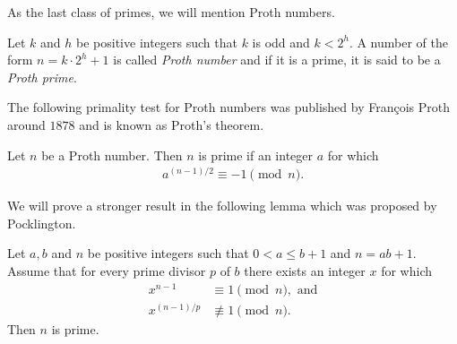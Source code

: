 \documentclass{subfiles}
\begin{document}
	As the last class of primes, we will mention Proth numbers.
	
		\begin{definition}
			Let $k$ and $h$ be positive integers such that $k$ is odd and $k < 2^h$. A number of the form $n=k \cdot 2^h +1$ is called \textit{Proth number} and if it is a prime, it is said to be a \textit{Proth prime}.
		\end{definition}
		
	The following primality test for Proth numbers was published by Fran\c cois Proth around $1878$ and is known as Proth's theorem.
	
		\begin{theorem}
			Let $n$ be a Proth number. Then $n$ is prime if an integer $a$ for which
				\begin{align*}
					a^{(n-1)/2} \equiv -1 \pmod n.
				\end{align*}
		\end{theorem}
		
	We will prove a stronger result in the following lemma which was proposed by Pocklington.
	
		\begin{lemma}
			Let $a, b$ and $n$  be positive integers such that $0<a \leq b+1$ and $n=ab+1$. Assume that for every prime divisor $p$ of $b$ there exists an integer $x$ for which
				\begin{align*}
					x^{n-1} &\equiv 1 \pmod n, \text{ and}\\
					x^{(n-1)/p} &\not \equiv 1 \pmod n.
				\end{align*}
			Then $n$ is prime.
		\end{lemma}
		
\end{document}
